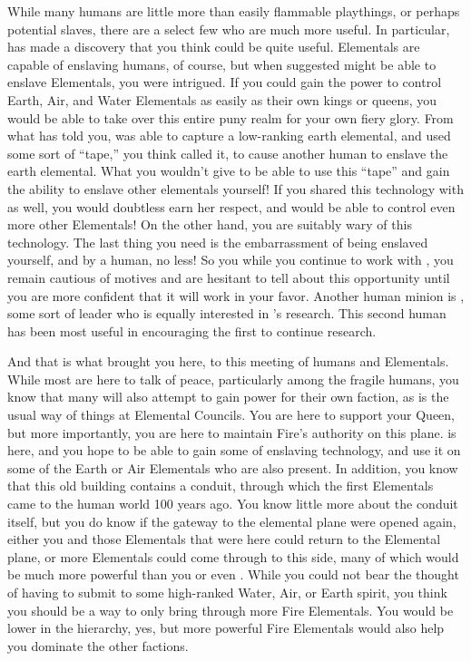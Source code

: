 \documentclass[char]{elementals}
\begin{document}
While many humans are little more than easily flammable playthings, or perhaps potential slaves, there are a select few who are much more useful.  In particular, \cMS{\intro} has made a discovery that you think could be quite useful.  Elementals are capable of enslaving humans, of course, but when \cMS{} suggested  might be able to enslave Elementals, you were intrigued.  If you could gain the power to control Earth, Air, and Water Elementals as easily as their own kings or queens, you would be able to take over this entire puny realm for your own fiery glory.  From what \cMS{} has told you, \cMS{\they} was able to capture a low-ranking earth elemental, and used some sort of ``tape,'' you think  called it, to cause another human to enslave the earth elemental.  What you wouldn't give to be able to use this ``tape'' and gain the ability to enslave other elementals yourself!  If you shared this technology with \cQueen{} as well, you would doubtless earn her respect, and  would be able to control even more other Elementals!  On the other hand, you are suitably wary of this technology.  The last thing you need is the embarrassment of being enslaved yourself, and by a human, no less!  So you while you continue to work with \cMS{}, you remain cautious of \cMS{\their} motives and are hesitant to tell \cQueen{} about this opportunity until you are more confident that it will work in your favor.  Another human minion is \cDema{\intro}, some sort of leader who is equally interested in \cMS{}'s research.  This second human has been most useful in encouraging the first to continue \cMS{\their} research.

And that is what brought you here, to this meeting of humans and Elementals.  While most are here to talk of peace, particularly among the fragile humans, you know that many will also attempt to gain power for their own faction, as is the usual way of things at Elemental Councils.  You are here to support your Queen, but more importantly, you are here to maintain Fire's authority on this plane.  \cMS{} is here, and you hope to be able to gain some of  enslaving technology, and use it on some of the Earth or Air Elementals who are also present.  In addition, you know that this old building contains a conduit, through which the first Elementals came to the human world 100 years ago.  You know little more about the conduit itself, but you do know if the gateway to the elemental plane were opened again, either you and those Elementals that were here could return to the Elemental plane, or more Elementals could come through to this side, many of which would be much more powerful than you or even \cQueen{}.  While you could not bear the thought of having to submit to some high-ranked Water, Air, or Earth spirit, you think you should be a way to only bring through more Fire Elementals.  You would be lower in the hierarchy, yes, but more powerful Fire Elementals would also help you dominate the other factions.  
\end{document}
